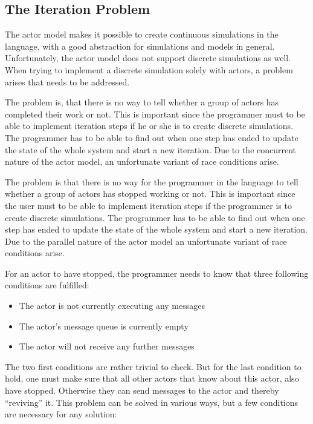\subsection{The Iteration Problem}

The actor model makes it possible to create continuous simulations in the language, with a good abstraction for simulations and models in general. Unfortunately, the actor model does not support discrete simulations as well. When trying to implement a discrete simulation solely with actors, a problem arises that needs to be addressed.

The problem is, that there is no way to tell whether a group of actors has completed their work or not. This is important since the programmer must to be able to implement iteration steps if he or she is to create discrete simulations. The programmer has to be able to find out when one step has ended to update the state of the whole system and start a new iteration. Due to the concurrent nature of the actor model, an unfortunate variant of race conditions arise.

The problem is that there is no way for the programmer in the language to tell whether a group of actors has stopped working or not. This is important since the user must to be able to implement iteration steps if the programmer is to create discrete simulations. The programmer has to be able to find out when one step has ended to update the state of the whole system and start a new iteration. Due to the parallel nature of the actor model an unfortunate variant of race conditions arise.

For an actor to have stopped, the programmer needs to know that three following conditions are fulfilled:
\begin{itemize}
\item The actor is not currently executing any messages
\item The actor's message queue is currently empty
\item The actor will not receive any further messages
\end{itemize} 

The two first conditions are rather trivial to check. But for the last condition to hold, one must make sure that all other actors that know about this actor, also have stopped. Otherwise they can send messages to the actor and thereby \enquote{reviving} it. This problem can be solved in various ways, but a few conditions are necessary for any solution:

